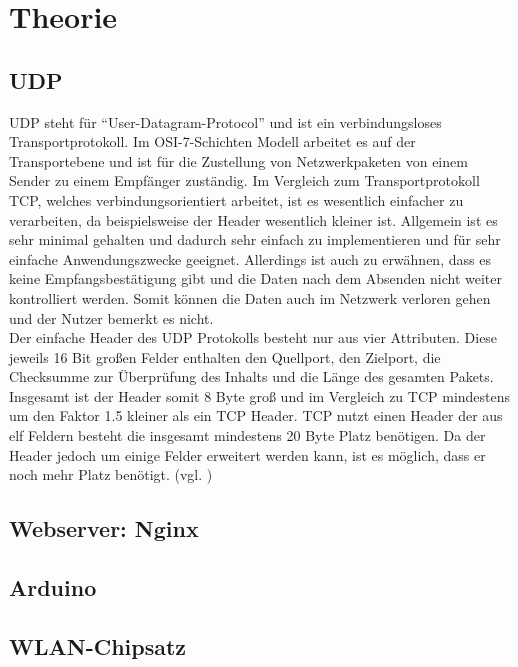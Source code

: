 \documentclass[ngerman]{scrartcl} %
\begin{document}
\section{Theorie}        
\label{sec:Theorie-1}  

\subsection{UDP}
\label{sec:UDP-1}
UDP steht für ``User-Datagram-Protocol'' und ist ein verbindungsloses Transportprotokoll. Im OSI-7-Schichten Modell arbeitet es auf der Transportebene und ist für die Zustellung von Netzwerkpaketen von einem Sender zu einem Empfänger zuständig. Im Vergleich zum Transportprotokoll TCP, welches verbindungsorientiert arbeitet, ist es wesentlich einfacher zu verarbeiten, da beispielsweise der Header wesentlich kleiner ist. Allgemein ist es sehr minimal gehalten und dadurch sehr einfach zu implementieren und für sehr einfache Anwendungszwecke geeignet. Allerdings ist auch zu erwähnen, dass es keine Empfangsbestätigung gibt und die Daten nach dem Absenden nicht weiter kontrolliert werden. Somit können die Daten auch im Netzwerk verloren gehen und der Nutzer bemerkt es nicht. \\

Der einfache Header des UDP Protokolls besteht nur aus vier Attributen. Diese jeweils 16 Bit großen Felder enthalten den Quellport, den Zielport, die Checksumme zur Überprüfung des Inhalts und die Länge des gesamten Pakets. Insgesamt ist der Header somit 8 Byte groß und im Vergleich zu TCP mindestens um den Faktor 1.5 kleiner als ein TCP Header. TCP nutzt einen Header der aus elf Feldern besteht die insgesamt mindestens 20 Byte Platz benötigen. Da der Header jedoch um einige Felder erweitert werden kann, ist es möglich, dass er noch mehr Platz benötigt. (vgl. \cite{ElektronikKompendium.}\cite{.}\cite{.23.02.2016})
 
\subsection{Webserver: Nginx}
\label{sec:Webserver: Nginx-1} 
 
\subsection{Arduino}
\label{sec:Arduino-1} 

\subsection{WLAN-Chipsatz}
\label{sec:WLAN-CHipsatz-1} 
 
\end{document}
